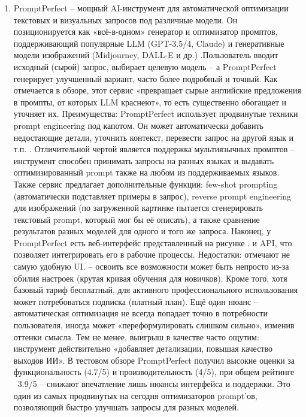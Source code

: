 \begin{enumerate}[label=\arabic*.]
\begin{figure}[htbp]
\end{figure}
\item  PromptPerfect – мощный AI-инструмент для автоматической оптимизации текстовых и визуальных запросов под различные модели. Он позиционируется как «всё-в-одном» генератор и оптимизатор промптов, поддерживающий популярные LLM (GPT-3.5/4, Claude) и генеративные модели изображений (Midjourney, DALL-E и др.) \cite{dhruvirzala:promptperfect}.Пользователь вводит исходный (сырой) запрос, выбирает целевую модель – а PromptPerfect генерирует улучшенный вариант, часто более подробный и точный. Как отмечается в обзоре, этот сервис «превращает сырые английские предложения в промпты, от которых LLM краснеют», то есть существенно обогащает и уточняет их.  Преимущества: PromptPerfect использует продвинутые техники prompt engineering под капотом. Он может автоматически добавить недостающие детали, уточнить контекст, перевести запрос на другой язык и т.п. \cite{dhruvirzala:promptperfect}. Отличительной чертой является поддержка мультиязычных промптов – инструмент способен принимать запросы на разных языках и выдавать оптимизированный prompt также на любом из поддерживаемых языков. Также сервис предлагает дополнительные функции: few-shot prompting (автоматически подставляет примеры в запрос), reverse prompt engineering для изображений (по загруженной картинке пытается сгенерировать текстовый prompt, который мог бы её описать), а также сравнение результатов разных моделей для одного и того же запроса. Наконец, у PromptPerfect есть веб-интерфейс представленный на рисунке \cite{dhruvirzala:promptperfect}. и API, что позволяет интегрировать его в рабочие процессы. Недостатки: отмечают не самую удобную UI\cite{dhruvirzala:promptperfect}. – освоить все возможности может быть непросто из-за обилия настроек (крутая кривая обучения для новичков). Кроме того, хотя базовый тариф бесплатный, для активного профессионального использования может потребоваться подписка (платный план). Ещё один нюанс – автоматическая оптимизация не всегда попадает точно в потребности пользователя, иногда может «переформулировать слишком сильно», изменив оттенки смысла. Тем не менее, выигрыш в качестве часто ощутим: инструмент действительно «добавляет детализации, повышая качество выходов ИИ»\cite{dhruvirzala:promptperfect}. В тестовом обзоре PromptPerfect получил высокие оценки за функциональность (4.7/5) и производительность (4/5), при общем рейтинге ~3.9/5 – снижают впечатление лишь нюансы интерфейса и поддержки. Это один из самых продвинутых на сегодня оптимизаторов prompt’ов, позволяющий быстро улучшать запросы для разных моделей. 

\end{enumerate}
